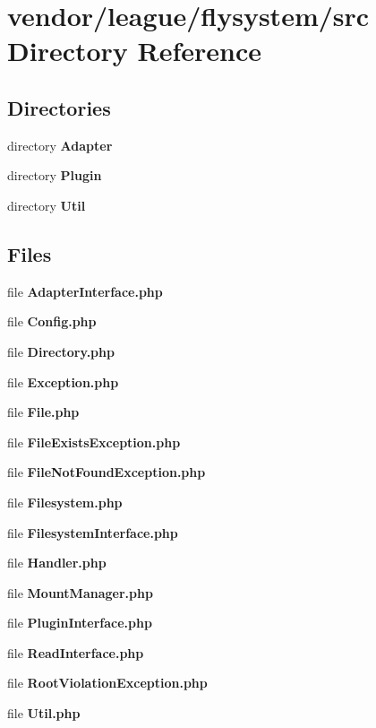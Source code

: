 \section{vendor/league/flysystem/src Directory Reference}
\label{dir_e291792ab8bd8d2f66f986213d87b8aa}
\subsection*{Directories}
\begin{DoxyCompactItemize}
\item 
directory {\bf Adapter}
\item 
directory {\bf Plugin}
\item 
directory {\bf Util}
\end{DoxyCompactItemize}
\subsection*{Files}
\begin{DoxyCompactItemize}
\item 
file {\bf Adapter\+Interface.\+php}
\item 
file {\bf Config.\+php}
\item 
file {\bf Directory.\+php}
\item 
file {\bf Exception.\+php}
\item 
file {\bf File.\+php}
\item 
file {\bf File\+Exists\+Exception.\+php}
\item 
file {\bf File\+Not\+Found\+Exception.\+php}
\item 
file {\bf Filesystem.\+php}
\item 
file {\bf Filesystem\+Interface.\+php}
\item 
file {\bf Handler.\+php}
\item 
file {\bf Mount\+Manager.\+php}
\item 
file {\bf Plugin\+Interface.\+php}
\item 
file {\bf Read\+Interface.\+php}
\item 
file {\bf Root\+Violation\+Exception.\+php}
\item 
file {\bf Util.\+php}
\end{DoxyCompactItemize}
